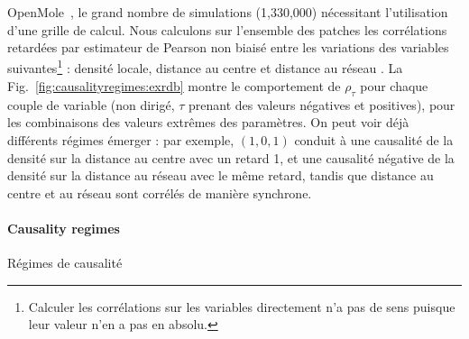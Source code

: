 {OpenMole~\cite{reuillon2013openmole}, le grand nombre de simulations (1,330,000) nécessitant l'utilisation d'une grille de calcul. Nous calculons sur l'ensemble des patches les corrélations retardées par estimateur de Pearson non biaisé entre les variations des variables suivantes\footnote{Calculer les corrélations sur les variables directement n'a pas de sens puisque leur valeur n'en a pas en absolu.} : densité locale, distance au centre et distance au réseau  . La Fig.~\ref{fig:causalityregimes:exrdb} montre le comportement de $\rho_{\tau}$ pour chaque couple de variable  (non dirigé, $\tau$ prenant des valeurs négatives et positives), pour les combinaisons des valeurs extrêmes des paramètres. On peut voir déjà différents régimes émerger : par exemple, $(1,0,1)$ conduit à une causalité de la densité sur la distance au centre avec un retard 1, et une causalité négative de la densité sur la distance au réseau avec le même retard, tandis que distance au centre et au réseau sont corrélés de manière synchrone. 
}




\paragraph{Causality regimes}{Régimes de causalité}


